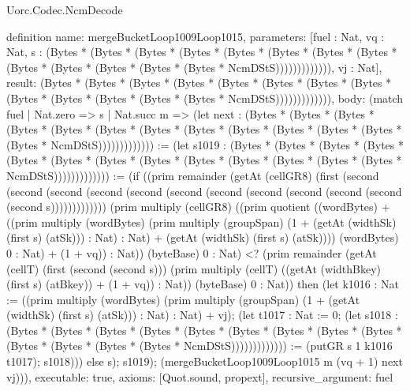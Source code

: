 \begin{lexlean}{Uorc.Codec.NcmDecode}
\begin{semanticmodule}
definition{
  name: mergeBucketLoop1009Loop1015,
  parameters: [fuel : Nat, vq : Nat, s : (Bytes * (Bytes * (Bytes * (Bytes * (Bytes * (Bytes * (Bytes * (Bytes * (Bytes * (Bytes * (Bytes * (Bytes * (Bytes * NcmDStS))))))))))))), vj : Nat],
  result: (Bytes * (Bytes * (Bytes * (Bytes * (Bytes * (Bytes * (Bytes * (Bytes * (Bytes * (Bytes * (Bytes * (Bytes * (Bytes * NcmDStS))))))))))))),
  body: (match fuel
    | Nat.zero => s
    | Nat.succ m => (let next : (Bytes * (Bytes * (Bytes * (Bytes * (Bytes * (Bytes * (Bytes * (Bytes * (Bytes * (Bytes * (Bytes * (Bytes * (Bytes * NcmDStS))))))))))))) := (let s1019 : (Bytes * (Bytes * (Bytes * (Bytes * (Bytes * (Bytes * (Bytes * (Bytes * (Bytes * (Bytes * (Bytes * (Bytes * (Bytes * NcmDStS))))))))))))) := (if ((prim remainder (getAt (cellGR8) (first (second (second (second (second (second (second (second (second (second (second (second (second s))))))))))))) (prim multiply (cellGR8) ((prim quotient ((wordBytes) + ((prim multiply (wordBytes) (prim multiply (groupSpan) (1 + (getAt (widthSk) (first s) (atSk))) : Nat) : Nat) + (getAt (widthSk) (first s) (atSk)))) (wordBytes) 0 : Nat) + (1 + vq)) : Nat)) (byteBase) 0 : Nat) <? (prim remainder (getAt (cellT) (first (second (second s))) (prim multiply (cellT) ((getAt (widthBkey) (first s) (atBkey)) + (1 + vq)) : Nat)) (byteBase) 0 : Nat)) then (let k1016 : Nat := ((prim multiply (wordBytes) (prim multiply (groupSpan) (1 + (getAt (widthSk) (first s) (atSk))) : Nat) : Nat) + vj); (let t1017 : Nat := 0; (let s1018 : (Bytes * (Bytes * (Bytes * (Bytes * (Bytes * (Bytes * (Bytes * (Bytes * (Bytes * (Bytes * (Bytes * (Bytes * (Bytes * NcmDStS))))))))))))) := (putGR s 1 k1016 t1017); s1018))) else s); s1019); (mergeBucketLoop1009Loop1015 m (vq + 1) next vj))),
  executable: true,
  axioms: [Quot.sound, propext],
  recursive_argument: fuel
}


\end{semanticmodule}
\end{lexlean}

